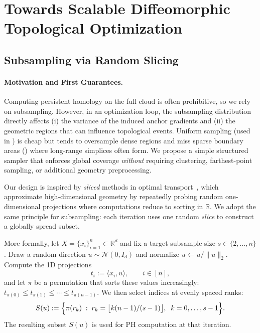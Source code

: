 \documentclass{article} %
\newcommand{\R}{\mathbb{R}}
\theoremstyle{plain}
\theoremstyle{definition}
\theoremstyle{remark}
\begin{document}
\section{Towards Scalable Diffeomorphic Topological Optimization}
\label{sec:method}

\subsection{Subsampling via Random Slicing}\label{subsec:proj_strat}
\paragraph{Motivation and First Guarantees.} Computing persistent homology on the full cloud is often prohibitive, so we rely on subsampling. However, in an optimization loop, the subsampling distribution directly affects (i) the variance of the induced anchor gradients and (ii) the geometric regions that can influence topological events. Uniform sampling (used in \cite{diffeomorphic}) is cheap but tends to oversample dense regions and miss sparse boundary areas () where long-range simplices often form. We propose a simple structured sampler that enforces global coverage \emph{without} requiring clustering, farthest-point sampling, or additional geometry preprocessing.

Our design is inspired by \emph{sliced} methods in optimal transport~\citep{sliced, Bonneel2015}, which approximate high-dimensional geometry by repeatedly probing random one-dimensional projections where computations reduce to sorting in $\R$. We adopt the same principle for subsampling: each iteration uses one random \emph{slice} to construct a globally spread subset.

More formally, let $X=\{x_i\}_{i=1}^n\subset\R^d$ and fix a target subsample size $s\in\{2,\dots,n\}$.
Draw a random direction $u\sim\mathcal{N}(0,I_d)$ and normalize $u\leftarrow u/\|u\|_2$.
Compute the 1D projections
\[
t_i := \langle x_i,u\rangle,\qquad i\in[n],
\]
and let $\pi$ be a permutation that sorts these values increasingly:
$t_{\pi(0)}\le t_{\pi(1)}\le \cdots \le t_{\pi(n-1)}$.
We then select indices at evenly spaced ranks:
\begin{equation}
\label{eq:proj_strat_def}
S(u)
:=
\Bigl\{\pi(r_k)\;:\; r_k=\big\lfloor k(n-1)/(s-1)\big\rfloor,\;\; k=0,\dots,s-1\Bigr\}.
\end{equation}
The resulting subset $S(u)$ is used for PH computation at that iteration.
\end{document}
